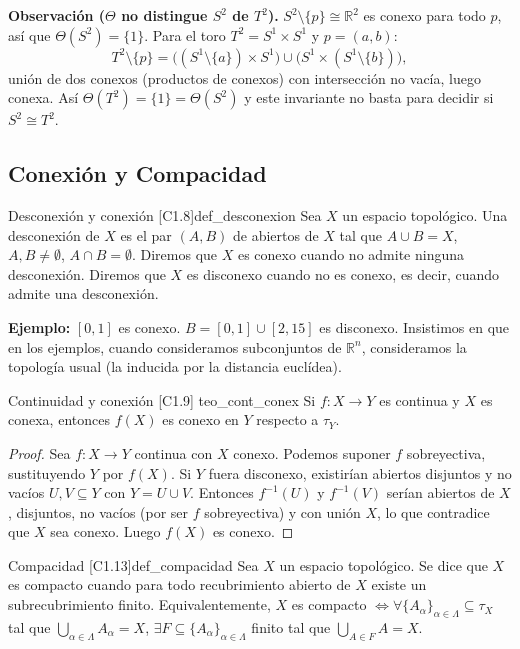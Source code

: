 \textbf{Observación ($\Theta$ no distingue $S^2$ de $T^2$).}
$S^2 \setminus \{p\} \cong \mathbb{R}^2$ es conexo para todo $p$, así que $\Theta(S^2) = \{1\}$. Para el toro $T^2 = S^1 \times S^1$ y $p = (a,b)$:
\[ T^2 \setminus \{p\} = \big( (S^1 \setminus \{a\}) \times S^1 \big) \cup \big( S^1 \times (S^1 \setminus \{b\}) \big), \]
unión de dos conexos (productos de conexos) con intersección no vacía, luego conexa. Así $\Theta(T^2) = \{1\} = \Theta(S^2)$ y este invariante no basta para decidir si $S^2 \cong T^2$.


\subsection{Conexión y Compacidad}

\begin{definicion}{Desconexión y conexión [C1.8]}{def_desconexion}
Sea $X$ un espacio topológico. Una desconexión de $X$ es el par $(A,B)$ de abiertos de $X$ tal que $A \cup B = X$, $A, B \neq \emptyset$, $A \cap B = \emptyset$.
Diremos que $X$ es conexo cuando no admite ninguna desconexión.
Diremos que $X$ es disconexo cuando no es conexo, es decir, cuando admite una desconexión.
\end{definicion}

\textbf{Ejemplo:} $[0,1]$ es conexo. $B = [0,1] \cup [2,15]$ es disconexo. Insistimos en que en los ejemplos, cuando consideramos subconjuntos de $\mathbb{R}^n$, consideramos la topología usual (la inducida por la distancia euclídea).

\begin{teorema}{Continuidad y conexión [C1.9] \marcaT}{teo_cont_conex}
Si $f \colon X \to Y$ es continua y $X$ es conexa, entonces $f(X)$ es conexo en $Y$ respecto a $\tau_Y$.
\end{teorema}

\begin{proof}
Sea $f \colon X \to Y$ continua con $X$ conexo. Podemos suponer $f$ sobreyectiva, sustituyendo $Y$ por $f(X)$. Si $Y$ fuera disconexo, existirían abiertos disjuntos y no vacíos $U, V \subseteq Y$ con $Y = U \cup V$. Entonces $f^{-1}(U)$ y $f^{-1}(V)$ serían abiertos de $X$, disjuntos, no vacíos (por ser $f$ sobreyectiva) y con unión $X$, lo que contradice que $X$ sea conexo. Luego $f(X)$ es conexo.
\end{proof}


\begin{definicion}{Compacidad [C1.13]}{def_compacidad}
Sea $X$ un espacio topológico. Se dice que $X$ es compacto cuando para todo recubrimiento abierto de $X$ existe un subrecubrimiento finito.
Equivalentemente, $X$ es compacto $\iff \forall \{A_\alpha\}_{\alpha \in \Lambda} \subseteq \tau_X$ tal que $\bigcup_{\alpha \in \Lambda} A_\alpha = X$, $\exists F \subseteq \{A_\alpha\}_{\alpha \in \Lambda}$ finito tal que $\bigcup_{A \in F} A = X$.
\end{definicion}

